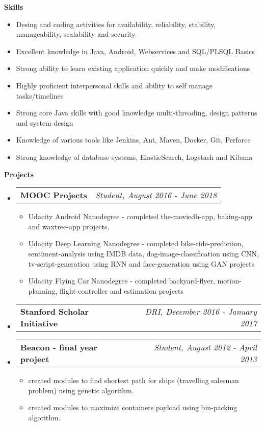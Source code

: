\documentclass[letterpaper,11pt]{article}
\makeatletter
\newcommand{\resitem}[1]{\item #1 \vspace{-2pt}}
\newcommand{\resheading}[1]{{\large \colorbox{mygrey}{\begin{minipage}{\textwidth}{\textbf{#1 \vphantom{p\^{E}}}}\end{minipage}}}}
\newcommand{\ressubheading}[4]{
\begin{tabular*}{7.0in}{l@{\extracolsep{\fill}}r}
		\textbf{#1} & \textit{#4} \\
\end{tabular*}\vspace{-6pt}}
\makeatother
\begin{document}
\resheading{Skills}
	
	\begin{itemize}
		\resitem{Desing and coding activities for availability, reliability, stability, manageability, scalability and security}
		\resitem{Excellent knowledge in Java, Android, Webservices and SQL/PLSQL Basics}
		\resitem{Strong ability to learn existing application quickly and make modifications}
		\resitem{Highly proficient interpersonal skills and ability to self manage tasks/timelines}
		\resitem{Strong core Java skills with good knowledge multi-threading, design patterns and system design}
		\resitem{Knowledge of various tools like Jenkins, Ant, Maven, Docker, Git, Perforce}
		\resitem{Strong knowledge of database systems,  ElasticSearch, Logstash and Kibana}
	\end{itemize}		



\resheading{Projects}
\begin{itemize}

\item
	\ressubheading{MOOC Projects}{Online}{Crowdsourcing}{Student, August 2016 - June 2018}
	\begin{itemize}
		\item Udacity Android Nanodegree - completed the-moviedb-app, baking-app and waxtree-app	projects.
	\item Udacity Deep Learning Nanodegree - completed bike-ride-prediction, sentiment-analysis using IMDB data, dog-image-classification using CNN, tv-script-generation using RNN and face-generation using GAN projects
	\item Udacity Flying Car Nanodegree - completed backyard-flyer, motion-planning, flight-controller and estimation projects
	\end{itemize}	


\item
	\ressubheading{Stanford Scholar Initiative}{Online}{Crowdsourcing}{DRI, December 2016 - January 2017}	
\item
	\ressubheading{Beacon - final year project}{APIIT,IN}{Student}{Student, August 2012 - April 2013}
	\begin{itemize}
	\item created modules to find shortest path for ships (travelling salesman problem) using genetic algorithm.
	\item created modules to maximize containers payload using bin-packing algorithm.
	\end{itemize}
\end{itemize}
\end{document}
